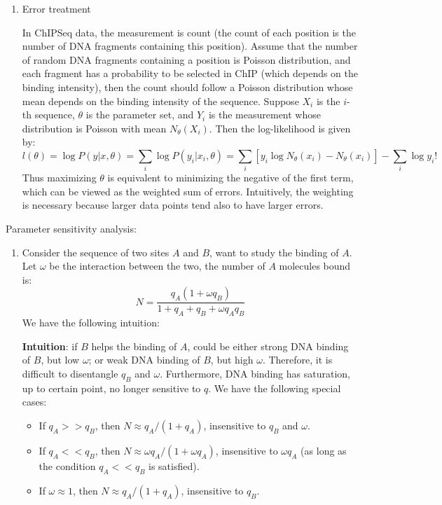 \documentclass[11pt]{article}
\begin{document}
\begin{enumerate}
\begin{enumerate}
\item Error treatment

In ChIPSeq data, the measurement is count (the count of each position is the number of DNA fragments containing this position). Assume that the number of random DNA fragments containing a position is Poisson distribution, and each fragment has a probability to be selected in ChIP (which depends on the binding intensity), then the count should follow a Poisson distribution whose mean depends on the binding intensity of the sequence. Suppose $X_i$ is the $i$-th sequence, $\theta$ is the parameter set, and $Y_i$ is the measurement whose distribution is Poisson with mean $N_{\theta}(X_i)$. Then the log-likelihood is given by: 
\begin{equation}
l(\theta) = \log P(y|x,\theta) = \sum_i \log P(y_i |x_i,\theta) = \sum_i\left[ {y_i \log N_{\theta}(x_i) - N_{\theta}(x_i)}\right] - \sum_i{\log{y_i !}}
\end{equation}
Thus maximizing $\theta$ is equivalent to minimizing the negative of the first term, which can be viewed as the weighted sum of errors. Intuitively, the weighting is necessary because larger data points tend also to have larger errors. 

\end{enumerate}

Parameter sensitivity analysis: 

\begin{enumerate}

\item Consider the sequence of two sites $A$ and $B$, want to study the binding of $A$. Let $\omega$ be the interaction between the two, the number of $A$ molecules bound is: 
\begin{equation}
N = \frac{q_A (1 + \omega q_B)}{1 + q_A + q_B + \omega q_A q_B}
\end{equation}
We have the following intuition: 

\textbf{Intuition}: if $B$ helps the binding of $A$, could be either strong DNA binding of $B$, but low $\omega$; or weak DNA binding of $B$, but high $\omega$. 
Therefore, it is difficult to disentangle $q_B$ and $\omega$. Furthermore, DNA binding has saturation, up to certain point, no longer sensitive to $q$. We have the following special cases: 
\begin{itemize}
\item If $q_A >> q_B$, then $N \approx q_A / (1 + q_A)$, insensitive to $q_B$ and $\omega$. 
\item If $q_A << q_B$, then $N \approx \omega q_A / (1 + \omega q_A)$, insensitive to $\omega q_A$ (as long as the condition $q_A << q_B$ is satisfied). 
\item If $\omega \approx 1$, then $N \approx q_A / (1 + q_A)$, insensitive to $q_B$. 
\end{itemize}


\end{enumerate}
\end{enumerate}
\end{document}
